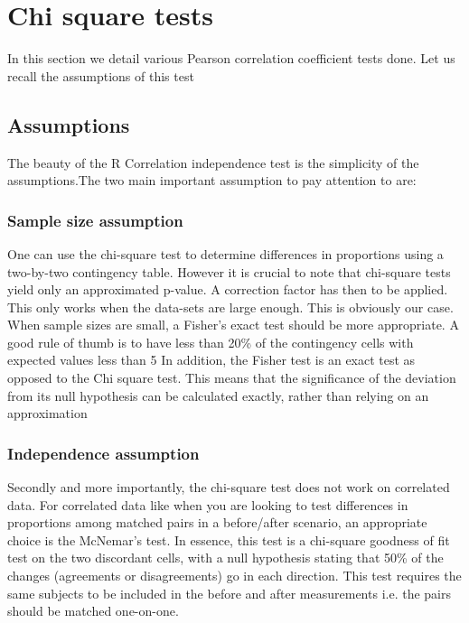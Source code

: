 \documentclass[a4paper]{article}
\theoremstyle{definition}
\theoremstyle{proposition}
\begin{document}
\section{Chi square tests}
In this section we detail various Pearson correlation coefficient  tests done. Let us recall the assumptions of this test

\subsection{Assumptions}
The beauty of the R Correlation independence test is the simplicity of the assumptions.The two main important assumption to pay attention to are:

\subsubsection{Sample size assumption}
One can use the chi-square test to determine differences in proportions using a two-by-two contingency table. However it is crucial to note that chi-square tests yield only an approximated p-value. A correction factor has then to be applied. This only works when the data-sets are large enough. This is obviously our case. When sample sizes are small, a Fisher's exact test  should be more appropriate. A good rule of thumb is to have less than 20\% of the contingency cells with expected values less than 5 
In addition, the Fisher test is an exact test as opposed to the Chi square test. This means that the significance of the deviation from its null hypothesis can be calculated exactly, rather than relying on an approximation

\subsubsection{Independence assumption}
Secondly and more importantly, the chi-square test does not work on correlated data. For correlated data like when you are looking to test differences in proportions among matched pairs in a before/after scenario, an appropriate choice is the McNemar's test. In essence, this test is a chi-square goodness of fit test on the two discordant cells, with a null hypothesis stating that 50\% of the changes (agreements or disagreements) go in each direction. This test requires the same subjects to be included in the before and after measurements i.e. the pairs should be matched one-on-one.  
\end{document}
